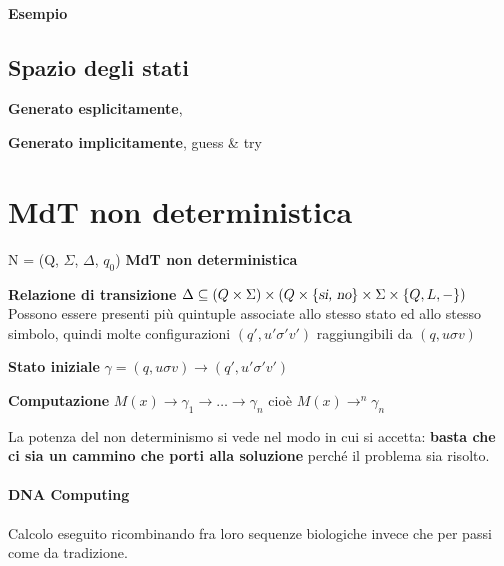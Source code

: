 \documentclass[10pt]{book}
\begin{document}
\paragraph{Esempio} %

\subsection{Spazio degli stati}
\begin{list}{}{Lo spazo degli stati di una MdT può essere}
	\item \textbf{Generato esplicitamente}, 
	\item \textbf{Generato implicitamente}, guess \& try
\end{list}
\section{MdT non deterministica}
N = (Q, $\Sigma$, $\Delta$, $q_0$) \textbf{MdT non deterministica}
\begin{list}{}{}
	\item \textbf{Relazione di transizione} $\Delta \subseteq (Q\times\Sigma)\times(Q\times\{\textsl{si, no}\}\times\Sigma\times\{Q, L, -\})$\\
	Possono essere presenti più quintuple associate allo stesso stato ed allo stesso simbolo, quindi molte configurazioni $(q', u'\sigma'v')$ raggiungibili da $(q, u\sigma v)$
	\item \textbf{Stato iniziale} $\gamma = (q, u\sigma v) \rightarrow (q', u'\sigma'v')$
	\item \textbf{Computazione} $M(x) \rightarrow\gamma_1\rightarrow\ldots\rightarrow\gamma_n$ cioè $M(x) \rightarrow^n\gamma_n$
\end{list}
La potenza del non determinismo si vede nel modo in cui si accetta: \textbf{basta che ci sia un cammino che porti alla soluzione} perché il problema sia risolto.
\paragraph{DNA Computing} Calcolo eseguito ricombinando fra loro sequenze biologiche invece che per passi come da tradizione.
\end{document}
